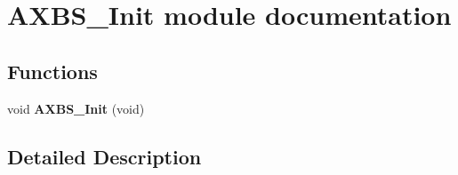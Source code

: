 \hypertarget{group___a_x_b_s___init__module}{}\section{A\+X\+B\+S\+\_\+\+Init module documentation}
\label{group___a_x_b_s___init__module}
\subsection*{Functions}
\begin{DoxyCompactItemize}
\item 
void {\bfseries A\+X\+B\+S\+\_\+\+Init} (void)\hypertarget{group___a_x_b_s___init__module_gade5be0b111add0a0efd8730822b7d8da}{}\label{group___a_x_b_s___init__module_gade5be0b111add0a0efd8730822b7d8da}

\end{DoxyCompactItemize}


\subsection{Detailed Description}
